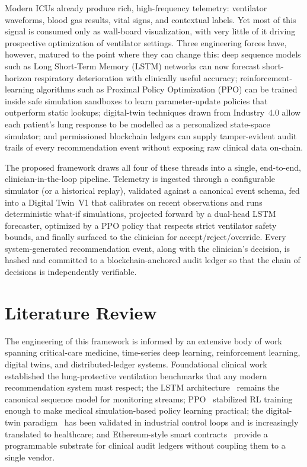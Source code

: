 \documentclass[12pt,a4paper,oneside]{report}
\begin{document}
Modern ICUs already produce rich, high-frequency telemetry: ventilator waveforms, blood gas results, vital signs, and contextual labels. Yet most of this signal is consumed only as wall-board visualization, with very little of it driving prospective optimization of ventilator settings. Three engineering forces have, however, matured to the point where they can change this: deep sequence models such as Long Short-Term Memory (LSTM) networks can now forecast short-horizon respiratory deterioration with clinically useful accuracy; reinforcement-learning algorithms such as Proximal Policy Optimization (PPO) can be trained inside safe simulation sandboxes to learn parameter-update policies that outperform static lookups; digital-twin techniques drawn from Industry~4.0 allow each patient's lung response to be modelled as a personalized state-space simulator; and permissioned blockchain ledgers can supply tamper-evident audit trails of every recommendation event without exposing raw clinical data on-chain.

The proposed framework draws all four of these threads into a single, end-to-end, clinician-in-the-loop pipeline. Telemetry is ingested through a configurable simulator (or a historical replay), validated against a canonical event schema, fed into a Digital Twin~V1 that calibrates on recent observations and runs deterministic what-if simulations, projected forward by a dual-head LSTM forecaster, optimized by a PPO policy that respects strict ventilator safety bounds, and finally surfaced to the clinician for accept/reject/override. Every system-generated recommendation event, along with the clinician's decision, is hashed and committed to a blockchain-anchored audit ledger so that the chain of decisions is independently verifiable.

\section{Literature Review}
The engineering of this framework is informed by an extensive body of work spanning critical-care medicine, time-series deep learning, reinforcement learning, digital twins, and distributed-ledger systems. Foundational clinical work~\cite{ards2000} established the lung-protective ventilation benchmarks that any modern recommendation system must respect; the LSTM architecture~\cite{hochreiter1997} remains the canonical sequence model for monitoring streams; PPO~\cite{schulman2017} stabilized RL training enough to make medical simulation-based policy learning practical; the digital-twin paradigm~\cite{tao2018,fahim2022} has been validated in industrial control loops and is increasingly translated to healthcare; and Ethereum-style smart contracts~\cite{wood2014} provide a programmable substrate for clinical audit ledgers without coupling them to a single vendor.
\end{document}
